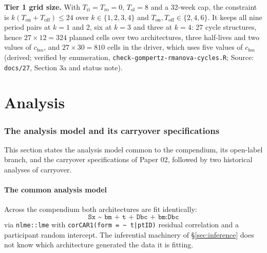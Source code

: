 \documentclass[11pt]{article}
\newcommand{\code}[1]{\texttt{#1}}
\begin{document}
\textbf{Tier 1 grid size.} With $T_{\mathrm{ri}} = T_{\mathrm{ro}} =
0$, $T_{\mathrm{ol}} = 8$ and a 32-week cap, the constraint is
$k(T_{\mathrm{on}} + T_{\mathrm{off}}) \le 24$ over $k \in \{1, 2, 3,
4\}$ and $T_{\mathrm{on}}, T_{\mathrm{off}} \in \{2, 4, 6\}$. It keeps
all nine period pairs at $k = 1$ and 2, six at $k = 3$ and three at
$k = 4$: 27 cycle structures, hence $27 \times 12 = 324$ planned cells
over two architectures, three half-lives and two values of $c_{bm}$,
and $27 \times 30 = 810$ cells in the driver, which uses five values of
$c_{bm}$ (derived; verified by enumeration, \code{check-gompertz-rmanova-cycles.R};
Source: \code{docs/27}, Section 3a and status note).

\part{Analysis}

\section{The analysis model and its carryover specifications}
\label{sec:analysis}

This section states the analysis model common to the compendium, its
open-label branch, and the carryover specifications of Paper 02,
followed by two historical analyses of carryover.

\subsection{The common analysis model}

Across the compendium both architectures are fit identically:
\begin{equation}
\code{Sx \textasciitilde\ bm + t + Dbc + bm:Dbc}
\label{eq:common-analysis}
\end{equation}
via \code{nlme::lme} with \code{corCAR1(form = \textasciitilde
t|ptID)} residual correlation and a participant random intercept. The
inferential machinery of \S\ref{sec:inference} does not know which
architecture generated the data it is fitting.
\end{document}
